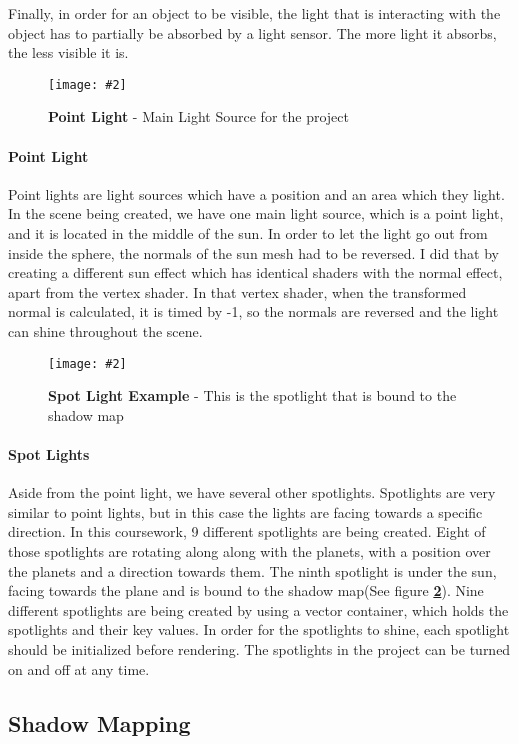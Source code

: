 \documentclass[10pt, a4paper]{article}
\newcommand{\figuremacro}[5]{
    \begin{figure}[#1]
        \centering
        \texttt{[image: \#2]}
        \caption[#3]{\textbf{#3}#4}
        \label{fig:#2}
    \end{figure}
}
\begin{document}
	Finally, in order for an object to be visible, the light that is interacting with the object has to partially be absorbed by a light sensor. The more light it absorbs, the less visible it is.
	
	
	\figuremacro{H}{Sun}{Point Light}{ - Main Light Source for the project}{1.0}
	
	\paragraph{Point Light}  Point lights are light sources which have a position and an area which they light. In the scene being created, we have one main light source, which is a point light, and it is located in the middle of the sun. In order to let the light go out from inside the sphere, the normals of the sun mesh had to be reversed. I did that by creating a different sun effect which has identical shaders with the normal effect, apart from the vertex shader. In that vertex shader, when the transformed normal is calculated, it is timed by -1, so the normals are reversed and the light can shine throughout the scene.
	
	\figuremacro{H}{Spotlight_Shadow}{Spot Light Example}{ - This is the spotlight that is bound to the shadow map}{1.0}
	
	\paragraph{Spot Lights} Aside from the point light, we have several other spotlights. Spotlights are very similar to point lights, but in this case the lights are facing towards a specific direction. In this coursework, 9 different spotlights are being created. Eight of those spotlights are rotating along along with the planets, with a position over the planets and a direction towards them. The ninth spotlight is under the sun, facing towards the plane and is bound to the shadow map(See figure \textbf{\ref{fig:Spotlight_Shadow}}). Nine different spotlights are being created by using a vector container, which holds the spotlights and their key values. In order for the spotlights to shine, each spotlight should be initialized before rendering. The spotlights in the project can be turned on and off at any time.
	



\subsection{Shadow Mapping}
\end{document}
